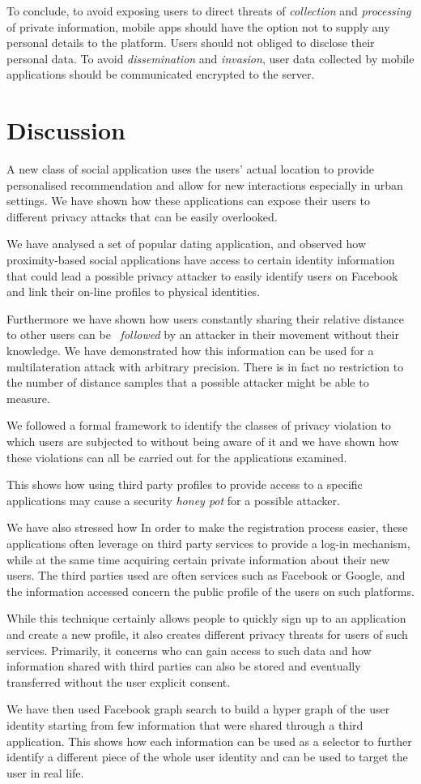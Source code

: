 To conclude, to avoid exposing users to direct threats of \emph{collection} and \emph{processing} of private information, mobile apps should have the option not to supply any personal details to the platform. Users should not obliged to disclose their personal data. To avoid \emph{dissemination} and \emph{invasion}, user data collected by mobile applications should be communicated encrypted to the server.

\section{Discussion}
\noindent
A new class of social application uses the users' actual location to provide personalised recommendation and allow for new interactions especially in urban settings. We have shown how these applications can expose their users to different privacy attacks that can be easily overlooked.

We have analysed a set of  popular dating application, and observed how proximity-based social applications have access to certain identity information that could lead a possible privacy attacker to easily identify users on Facebook and link their on-line profiles to physical identities.

Furthermore we have shown how users constantly sharing their relative distance to other users can be ~\emph{followed} by an attacker in their movement without their knowledge. We have demonstrated how this information can be used for a multilateration attack with arbitrary precision. There is in fact no restriction to the number of distance samples that a possible attacker might be able to measure.

We followed a formal framework to identify the classes of privacy violation to which users are subjected to without being aware of it and we have shown how these violations can all be carried out for the applications examined.

This shows how using third party profiles to provide access to a specific applications may cause a security \emph{honey pot} for a possible attacker.

We have also stressed how In order to make the registration process easier, these applications often leverage on third party services to provide a log-in mechanism, while at the same time acquiring certain private information about their new users. The third parties used are often services such as Facebook or Google, and the information accessed concern the public profile of the users on such platforms.

While this technique certainly allows people to quickly sign up to an application and create a new profile, it also creates different privacy threats for users of such services. Primarily, it concerns who can gain access to such data and how information shared with third parties can also be stored and eventually transferred without the user explicit consent.

We have then used Facebook graph search to build a hyper graph of the user identity starting from few information that were shared through a third application. This shows how each information can be used as a selector to further identify a different piece of the whole user identity and can be used to target the user in real life.